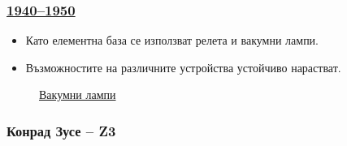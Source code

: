 \documentclass[ignorenonframetext, hyperref=unicode]{beamer}
\begin{document}
\begin{frame}
\frametitle{\href{http://en.wikipedia.org/wiki/History_of_computing_hardware}{1940--1950}}
\begin{itemize}
  \item Като елементна база се използват релета и вакумни лампи.
  \item Възможностите на различните устройства устойчиво нарастват.
\end{itemize}
\begin{figure}[h]
\center
{}
\caption{\href{http://en.wikipedia.org/wiki/Vacuum_tube}{Вакумни лампи}}
\end{figure}

\end{frame}

\subsubsection{Конрад Зусе -- Z3}
\end{document}
